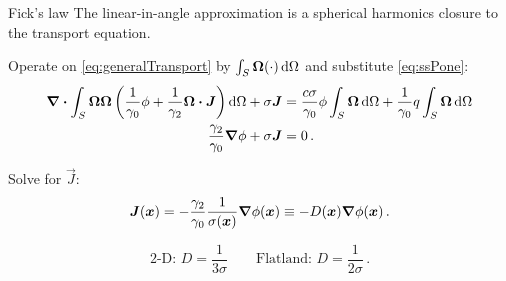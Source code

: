 \documentclass{beamer}
\begin{document}
\begin{frame}{Fick's law}
The linear-in-angle approximation is a spherical harmonics closure to the
transport equation.

Operate on \eqref{eq:generalTransport} by $\int_S \bm{\Omega} (\cdot)
\mathop{}\!\mathrm{d}\Omega$ and substitute \eqref{eq:ssPone}:
\begin{align*}
  \bm{\nabla} \bm{\cdot} \int_S \bm{\Omega} \bm{\Omega} \left(
  \frac{1}{\gamma_0}\phi + \frac{1}{\gamma_2} \bm{\Omega} \bm{\cdot} \bm{J}
  \right)
  \mathop{}\!\mathrm{d}\Omega
  + \sigma \bm{J}
  &=
  \frac{c\sigma}{\gamma_0} \phi \int_S \bm{\Omega} \mathop{}\!\mathrm{d}\Omega
  + \frac{1}{\gamma_0} q \int_S \bm{\Omega} \mathop{}\!\mathrm{d}\Omega
  \\
  \frac{\gamma_2}{\gamma_0} \bm{\nabla} \phi + \sigma \bm{J} &= 0 \,.
\end{align*}

Solve for $\vec{J}$:
\begin{equation} \label{eq:fickGeneral}
  \bm{J}(\bm{x})
  = - \frac{\gamma_2}{\gamma_0} \frac{1}{\sigma(\bm{x})} \bm{\nabla} \phi(\bm{x})
  \equiv -D(\bm{x}) \bm{\nabla} \phi(\bm{x})\,.
\end{equation}

\begin{equation*}
  \text{2-D: } D = \frac{1}{3\sigma} \qquad
  \text{Flatland: } D = \frac{1}{2\sigma}\,.
\end{equation*}
\end{frame}

\end{document}
